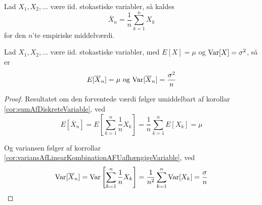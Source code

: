 \begin{definition}
  Lad $X_{1}, X_{2}, \ldots$ være iid. stokastiske variabler, så kaldes
  \[
    \overline{X}_{n} = \frac{1}{n} \sum_{k=1}^n X_{k}
  \]
  for den $n$'te empiriske middelværdi.
\end{definition}

\begin{lemma} \label{lem:variansOgForventedeVærdiAfEmpiriskMiddelværdi}
  Lad $X_{1}, X_{2}, \ldots$ være iid. stokastiske variabler, med $E[X] = \mu$ og $\textnormal{Var}[X] = \sigma^{2}$, så er
  \begin{equation*}
    E[\overline{X}_{n}] = \mu \text{ og } \textnormal{Var}[\overline{X}_{n}] = \frac{\sigma^{2}}{n}
  \end{equation*}
\end{lemma}
\begin{proof}
  Resultatet om den forventede værdi følger umiddelbart af korollar \ref{cor:sumAfDiskreteVariable}, ved
  \begin{equation*}
    E[\overline{X}_{n}] = E \left[\sum^{n}_{k = 1} \frac{1}{n} X_{k}\right] = \frac{1}{n} \sum_{k=1}^{n} E[X_{k}] = \mu
  \end{equation*}

  Og variansen følger af korrollar \ref{cor:variansAfLinearKombinationAFUafhængigeVariable}, ved
  \begin{equation*}
    \textnormal{Var}[\overline{X}_{n}] = \textnormal{Var} \left[\sum^{n}_{k = 1} \frac{1}{n} X_{k}\right] = \frac{1}{n^{2}} \sum_{k=1}^{n} \textnormal{Var}[X_{k}] = \frac{\sigma}{n}
  \end{equation*}
\end{proof}

